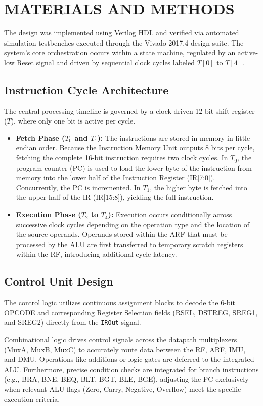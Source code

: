 \documentclass[pdftex,12pt,a4paper]{article}
\begin{document}
\section{MATERIALS AND METHODS}
The design was implemented using Verilog HDL and verified via automated simulation testbenches executed through the Vivado 2017.4 design suite. The system's core orchestration occurs within a state machine, regulated by an active-low Reset signal and driven by sequential clock cycles labeled $T[0]$ to $T[4]$.

\subsection{Instruction Cycle Architecture}
The central processing timeline is governed by a clock-driven 12-bit shift register ($T$), where only one bit is active per cycle.
\begin{itemize}
    \item \textbf{Fetch Phase ($T_0$ and $T_1$):} The instructions are stored in memory in little-endian order. Because the Instruction Memory Unit outputs 8 bits per cycle, fetching the complete 16-bit instruction requires two clock cycles. In $T_0$, the program counter (PC) is used to load the lower byte of the instruction from memory into the lower half of the Instruction Register (IR[7:0]). Concurrently, the PC is incremented. In $T_1$, the higher byte is fetched into the upper half of the IR (IR[15:8]), yielding the full instruction.
    \item \textbf{Execution Phase ($T_2$ to $T_4$):} Execution occurs conditionally across successive clock cycles depending on the operation type and the location of the source operands. Operands stored within the ARF that must be processed by the ALU are first transferred to temporary scratch registers within the RF, introducing additional cycle latency.
\end{itemize}

\subsection{Control Unit Design}
The control logic utilizes continuous assignment blocks to decode the 6-bit OPCODE and corresponding Register Selection fields (RSEL, DSTREG, SREG1, and SREG2) directly from the \texttt{IROut} signal. 

Combinational logic drives control signals across the datapath multiplexers (MuxA, MuxB, MuxC) to accurately route data between the RF, ARF, IMU, and DMU. Operations like additions or logic gates are deferred to the integrated ALU. Furthermore, precise condition checks are integrated for branch instructions (e.g., BRA, BNE, BEQ, BLT, BGT, BLE, BGE), adjusting the PC exclusively when relevant ALU flags (Zero, Carry, Negative, Overflow) meet the specific execution criteria.
\end{document}
